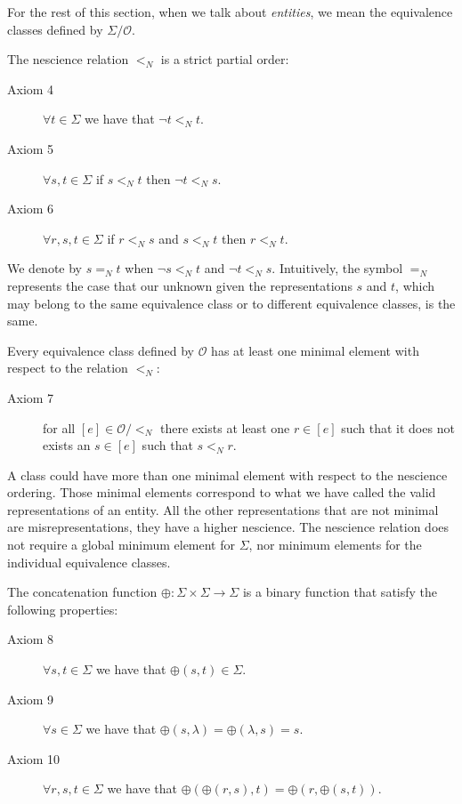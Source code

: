 For the rest of this section, when we talk about \emph{entities}, we mean the equivalence classes defined by $\Sigma / \mathcal{O}$.

The nescience relation $<_N$ is a strict partial order:

\vskip 0.25cm

\begin{description}
\item[Axiom 4] $\forall t \in \Sigma$ we have that $\lnot t <_N t$.
\item[Axiom 5] $\forall s , t \in \Sigma$ if $s <_N t$ then $\lnot t <_N s$.
\item[Axiom 6] $\forall r , s, t \in \Sigma$ if $r <_N s$ and $s <_N t$ then $r <_N t$.
\end{description}

\vskip 0.25cm

We denote by $ s =_N t$ when $\lnot s <_N t$ and $\lnot t <_N s$. Intuitively, the symbol $=_N$ represents the case that our unknown given the representations $s$ and $t$, which may belong to the same equivalence class or to different equivalence classes, is the same. 

Every equivalence class defined by $\mathcal{O}$ has at least one minimal element with respect to the relation $<_N$:

\vskip 0.25cm

\begin{description}
\item[Axiom 7] for all $[e] \in \mathcal{O} / <_N$ there exists at least one $r \in [e]$ such that it does not exists an $s \in [e]$ such that $s <_N r$.
\end{description}

\vskip 0.25cm

A class could have more than one minimal element with respect to the nescience ordering. Those minimal elements correspond to what we have called the valid representations of an entity. All the other representations that are not minimal are misrepresentations, they have a higher nescience. The nescience relation does not require a global minimum element for $\Sigma$, nor minimum elements for the individual equivalence classes.

The concatenation function $\oplus : \Sigma \times \Sigma \rightarrow \Sigma$ is a binary function that satisfy the following properties:

\vskip 0.25cm

\begin{description}
\item[Axiom 8] $\forall s, t \in \Sigma$ we have that $\oplus(s, t) \in \Sigma$.
\item[Axiom 9] $\forall s \in \Sigma$ we have that $\oplus(s, \lambda) = \oplus( \lambda, s) = s$.
\item[Axiom 10] $\forall r, s, t \in \Sigma$ we have that $\oplus(\oplus(r, s), t) = \oplus(r, \oplus(s, t))$.
\end{description}

